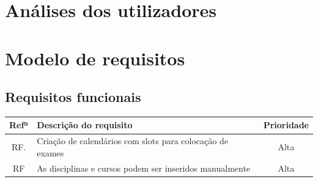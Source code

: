 \documentclass[11pt, twoside]{report}
\begin{document}
 	

	\chapter{Análises dos utilizadores}
	
	\chapter{Modelo de requisitos}
	\section{Requisitos funcionais}

	\pagebreak %
	\begin{center}
				\begin{tabularx}{\textwidth}{|c|X|c|}
				\hline
				\textbf{Refª }	& \textbf{Descrição do requisito} & \textbf{Prioridade} \\
				\hline
				RF. & Criação de calendários com slots para colocação de exames & Alta \\
				\hline
				RF & As disciplinas e cursos podem ser inseridos manualmente & Alta\\
				\hline
				

\end{tabularx}
\end{center}
\end{document}
